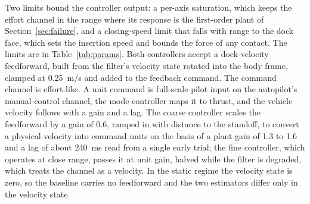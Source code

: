 Two limits bound the controller output: a per-axis saturation, which keeps the effort channel in the range where its response is the first-order plant of Section~\ref{sec:failure}, and a closing-speed limit that falls with range to the dock face, which sets the insertion speed and bounds the force of any contact. The limits are in Table~\ref{tab:params}. Both controllers accept a dock-velocity feedforward, built from the filter's velocity state rotated into the body frame, clamped at 0.25~m/s and added to the feedback command. The command channel is effort-like. A unit command is full-scale pilot input on the autopilot's manual-control channel, the mode controller maps it to thrust, and the vehicle velocity follows with a gain and a lag. The coarse controller scales the feedforward by a gain of 0.6, ramped in with distance to the standoff, to convert a physical velocity into command units on the basis of a plant gain of 1.3 to 1.6 and a lag of about 240~ms read from a single early trial; the fine controller, which operates at close range, passes it at unit gain, halved while the filter is degraded, which treats the channel as a velocity. In the static regime the velocity state is zero, so the baseline carries no feedforward and the two estimators differ only in the velocity state.
